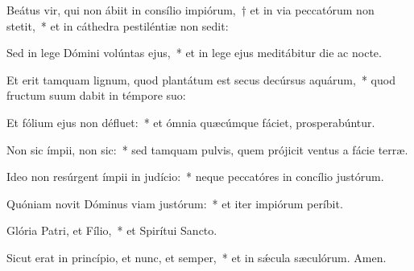\item Beátus vir, qui non ábiit in consílio impiórum,~† et in via peccatórum non stetit,~* et in cáthedra pestiléntiæ non sedit:

\item Sed in lege Dómini volúntas ejus,~* et in lege ejus meditábitur die ac nocte.

\item Et erit tamquam lignum, quod plantátum est secus decúrsus aquárum,~* quod fructum suum dabit in témpore suo:

\item Et fólium ejus non défluet:~* et ómnia quæcúmque fáciet, prosperabúntur.

\item Non sic ímpii, non sic:~* sed tamquam pulvis, quem prójicit ventus a fácie terræ.

\item Ideo non resúrgent ímpii in judício:~* neque peccatóres in concílio justórum.

\item Quóniam novit Dóminus viam justórum:~* et iter impiórum períbit.

\item Glória Patri, et Fílio,~* et Spirítui Sancto.

\item Sicut erat in princípio, et nunc, et semper,~* et in sǽcula sæculórum. Amen.